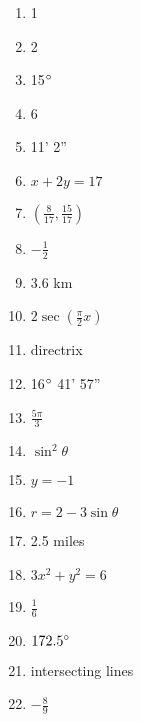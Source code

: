 \documentclass[../uilmath.tex]{subfiles}
\begin{document}
\begin{enumerate}[label=\bfseries\arabic*.]
    \item %
    1

    \item %
    2

    \item %
    15$\degree$

    \item %
    6

    \item %
    11' 2'' 

    \item %
    $x+2y=17$

    \item %
    $(\frac{8}{17},\frac{15}{17})$

    \item %
    $-\frac{1}{2}$

    \item %
    3.6 km

    \item %
    $2\sec(\frac{\pi}{2}x)$

    \item %
    directrix
    
    \item %
    16$\degree$ 41' 57''

    \item %
    $\frac{5\pi}{3}$

    \item %
    $\sin^2\theta$

    \item %
    $y=-1$

    \item %
    $r=2-3\sin\theta$

    \item %
    2.5 miles 

    \item %
    $3x^2+y^2=6$

    \item %
    $\frac{1}{6}$

    \item %
    $172.5\degree$

    \item %
    intersecting lines 

    \item %
    $-\frac{8}{9}$


\end{enumerate}
\end{document}
